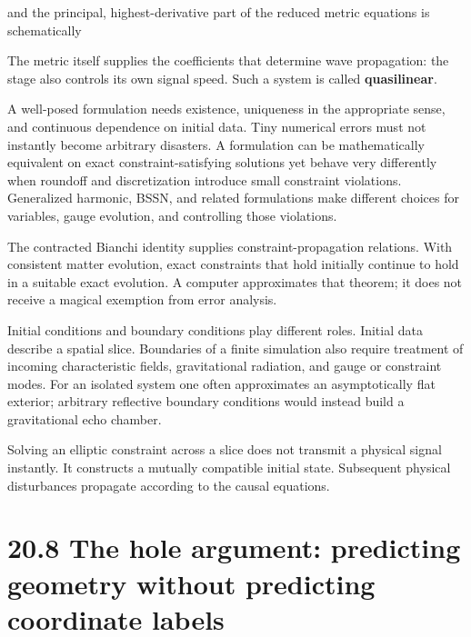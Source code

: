 \documentclass[
  11pt,
  letterpaper,
  oneside,
  openany]{scrbook}
\begin{document}
and the principal, highest-derivative part of the reduced metric
equations is schematically

\begin{center}
\begingroup
{}
\ifdim\wd\grmathbox>\linewidth
\resizebox{\linewidth}{!}{\usebox{\grmathbox}}
\else\usebox{\grmathbox}\fi
\endgroup
\end{center}

The metric itself supplies the coefficients that determine wave
propagation: the stage also controls its own signal speed. Such a system
is called \textbf{quasilinear}.

A well-posed formulation needs existence, uniqueness in the appropriate
sense, and continuous dependence on initial data. Tiny numerical errors
must not instantly become arbitrary disasters. A formulation can be
mathematically equivalent on exact constraint-satisfying solutions yet
behave very differently when roundoff and discretization introduce small
constraint violations. Generalized harmonic, BSSN, and related
formulations make different choices for variables, gauge evolution, and
controlling those violations.

The contracted Bianchi identity supplies constraint-propagation
relations. With consistent matter evolution, exact constraints that hold
initially continue to hold in a suitable exact evolution. A computer
approximates that theorem; it does not receive a magical exemption from
error analysis.

Initial conditions and boundary conditions play different roles. Initial
data describe a spatial slice. Boundaries of a finite simulation also
require treatment of incoming characteristic fields, gravitational
radiation, and gauge or constraint modes. For an isolated system one
often approximates an asymptotically flat exterior; arbitrary reflective
boundary conditions would instead build a gravitational echo chamber.

Solving an elliptic constraint across a slice does not transmit a
physical signal instantly. It constructs a mutually compatible initial
state. Subsequent physical disturbances propagate according to the
causal equations.

\hypertarget{the-hole-argument-predicting-geometry-without-predicting-coordinate-labels}{%
\section{20.8 The hole argument: predicting geometry without predicting
coordinate
labels}\label{the-hole-argument-predicting-geometry-without-predicting-coordinate-labels}}
\end{document}

